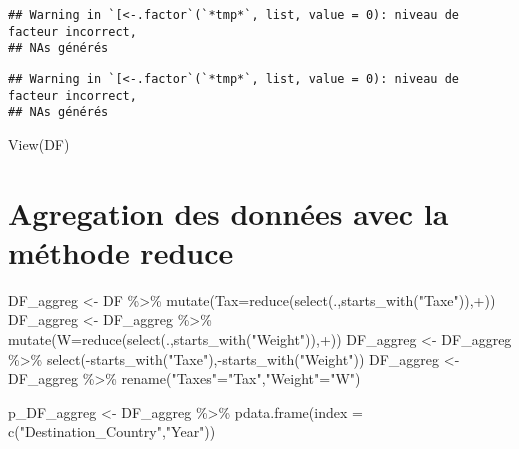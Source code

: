 \documentclass[
]{book}
\newenvironment{Shaded}{\begin{snugshade}}{\end{snugshade}}
\newcommand{\AttributeTok}[1]{\textcolor[rgb]{0.77,0.63,0.00}{#1}}
\newcommand{\FunctionTok}[1]{\textcolor[rgb]{0.00,0.00,0.00}{#1}}
\newcommand{\NormalTok}[1]{#1}
\newcommand{\OtherTok}[1]{\textcolor[rgb]{0.56,0.35,0.01}{#1}}
\newcommand{\SpecialCharTok}[1]{\textcolor[rgb]{0.00,0.00,0.00}{#1}}
\newcommand{\StringTok}[1]{\textcolor[rgb]{0.31,0.60,0.02}{#1}}
\begin{document}
\begin{verbatim}
## Warning in `[<-.factor`(`*tmp*`, list, value = 0): niveau de facteur incorrect,
## NAs générés
\end{verbatim}

\begin{verbatim}
## Warning in `[<-.factor`(`*tmp*`, list, value = 0): niveau de facteur incorrect,
## NAs générés
\end{verbatim}

\begin{Shaded}
\begin{Highlighting}[]
\FunctionTok{View}\NormalTok{(DF)}
\end{Highlighting}
\end{Shaded}

\hypertarget{agregation-des-donnuxe9es-avec-la-muxe9thode-reduce}{%
\section{Agregation des données avec la méthode reduce}\label{agregation-des-donnuxe9es-avec-la-muxe9thode-reduce}}

\begin{Shaded}
\begin{Highlighting}[]
\NormalTok{DF\_aggreg }\OtherTok{\textless{}{-}}\NormalTok{ DF }\SpecialCharTok{\%\textgreater{}\%} \FunctionTok{mutate}\NormalTok{(}\AttributeTok{Tax=}\FunctionTok{reduce}\NormalTok{(}\FunctionTok{select}\NormalTok{(.,}\FunctionTok{starts\_with}\NormalTok{(}\StringTok{"Taxe"}\NormalTok{)),}\StringTok{\textasciigrave{}}\AttributeTok{+}\StringTok{\textasciigrave{}}\NormalTok{))}
\NormalTok{DF\_aggreg }\OtherTok{\textless{}{-}}\NormalTok{ DF\_aggreg  }\SpecialCharTok{\%\textgreater{}\%} \FunctionTok{mutate}\NormalTok{(}\AttributeTok{W=}\FunctionTok{reduce}\NormalTok{(}\FunctionTok{select}\NormalTok{(.,}\FunctionTok{starts\_with}\NormalTok{(}\StringTok{"Weight"}\NormalTok{)),}\StringTok{\textasciigrave{}}\AttributeTok{+}\StringTok{\textasciigrave{}}\NormalTok{))}
\NormalTok{DF\_aggreg }\OtherTok{\textless{}{-}}\NormalTok{ DF\_aggreg }\SpecialCharTok{\%\textgreater{}\%} \FunctionTok{select}\NormalTok{(}\SpecialCharTok{{-}}\FunctionTok{starts\_with}\NormalTok{(}\StringTok{"Taxe"}\NormalTok{),}\SpecialCharTok{{-}}\FunctionTok{starts\_with}\NormalTok{(}\StringTok{"Weight"}\NormalTok{))}
\NormalTok{DF\_aggreg }\OtherTok{\textless{}{-}}\NormalTok{ DF\_aggreg }\SpecialCharTok{\%\textgreater{}\%} 
  \FunctionTok{rename}\NormalTok{(}\StringTok{"Taxes"}\OtherTok{=}\StringTok{"Tax"}\NormalTok{,}\StringTok{"Weight"}\OtherTok{=}\StringTok{"W"}\NormalTok{)}

\NormalTok{p\_DF\_aggreg }\OtherTok{\textless{}{-}}\NormalTok{ DF\_aggreg }\SpecialCharTok{\%\textgreater{}\%} \FunctionTok{pdata.frame}\NormalTok{(}\AttributeTok{index =} \FunctionTok{c}\NormalTok{(}\StringTok{"Destination\_Country"}\NormalTok{,}\StringTok{"Year"}\NormalTok{))}
\end{Highlighting}
\end{Shaded}
\end{document}
